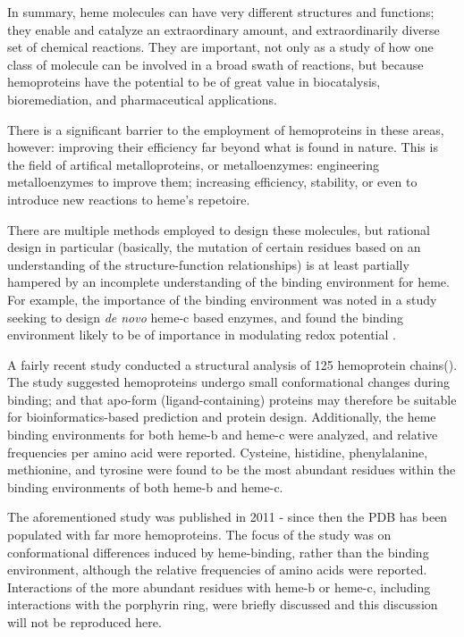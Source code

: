 \documentclass[a4paper, nobind]{templates/ociamthesis}
\begin{document}
In summary, heme molecules can have very different structures and functions; they enable and catalyze an extraordinary amount, and extraordinarily diverse set of chemical reactions. They are important, not only as a study of how one class of molecule can be involved in a broad swath of reactions, but because hemoproteins have the potential to be of great value in biocatalysis, bioremediation, and pharmaceutical applications.

There is a significant barrier to the employment of hemoproteins in these areas, however: improving their efficiency far beyond what is found in nature. This is the field of artifical metalloproteins, or metalloenzymes: engineering metalloenzymes to improve them; increasing efficiency, stability, or even to introduce new reactions to heme's repetoire.

There are multiple methods employed to design these molecules, but rational design in particular (basically, the mutation of certain residues based on an understanding of the structure-function relationships) is at least partially hampered by an incomplete understanding of the binding environment for heme. For example, the importance of the binding environment was noted in a study seeking to design \emph{de novo} heme-c based enzymes, and found the binding environment likely to be of importance in modulating redox potential \autocite{Ishida2004}.

A fairly recent study conducted a structural analysis of 125 hemoprotein chains(\textcite{Li2011}). The study suggested hemoproteins undergo small conformational changes during binding; and that apo-form (ligand-containing) proteins may therefore be suitable for bioinformatics-based prediction and protein design. Additionally, the heme binding environments for both heme-b and heme-c were analyzed, and relative frequencies per amino acid were reported. Cysteine, histidine, phenylalanine, methionine, and tyrosine were found to be the most abundant residues within the binding environments of both heme-b and heme-c.~

The aforementioned study was published in 2011 - since then the PDB has been populated with far more hemoproteins. The focus of the study was on conformational differences induced by heme-binding, rather than the binding environment, although the relative frequencies of amino acids were reported. Interactions of the more abundant residues with heme-b or heme-c, including interactions with the porphyrin ring, were briefly discussed and this discussion will not be reproduced here.
\end{document}

